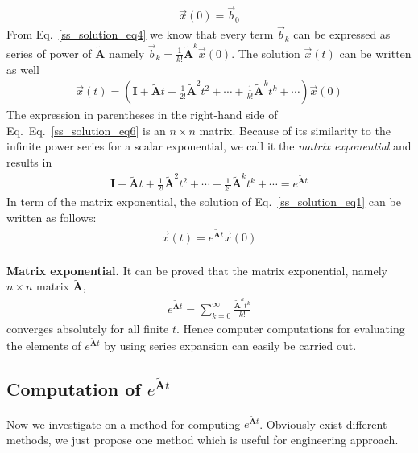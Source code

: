 \documentclass[12pt,a4paper,oneside]{book}
\begin{document}
\begin{onehalfspace}
\begin{equation}
	\begin{aligned}
		\vec{x}(0) = \vec{b}_0
	\end{aligned}
\end{equation}
From Eq.~\eqref{ss_solution_eq4} we know that every term $\vec{b}_k$ can be 
expressed as series of power of $\tilde{\mathbf{A}}$ namely $\vec{b}_k = 
\frac{1}{k!} \tilde{\mathbf{A}}^k \vec{x}(0)$. The solution $\vec{x}(t)$ can be 
written as well
\begin{equation}\label{ss_solution_eq6}
	\begin{aligned}
		\vec{x}(t) = \left(\mathbf{I} + \tilde{\mathbf{A}}t+\frac{1}{2!}\tilde{\mathbf{A}}^2t^2+\cdots+\frac{1}{k!}\tilde{\mathbf{A}}^kt^k+\cdots\right)\vec{x}(0)
	\end{aligned}
\end{equation}
The expression in parentheses in the right-hand side of 
Eq.~Eq.~\eqref{ss_solution_eq6} is an $n \times n$ matrix. Because of its 
similarity to the infinite power series for a scalar exponential, we call it 
the \textit{matrix exponential} and results in 
\begin{equation}\label{ss_solution_eq7}
	\begin{aligned}
		\mathbf{I} + \tilde{\mathbf{A}}t+\frac{1}{2!}\tilde{\mathbf{A}}^2t^2+\cdots+\frac{1}{k!}\tilde{\mathbf{A}}^kt^k+\cdots=e^{\tilde{\mathbf{A}}t}
	\end{aligned}
\end{equation}
In term of the matrix exponential, the solution of Eq.~\eqref{ss_solution_eq1} 
can be written as follows:
\begin{equation}\label{ss_solution_eq8}
	\begin{aligned}
		\vec{x}(t) = e^{\tilde{\mathbf{A}}t}\vec{x}(0)
	\end{aligned}
\end{equation}\\
\textbf{Matrix exponential.} It can be proved that the matrix exponential, 
namely $n \times n$ matrix $\tilde{\mathbf{A}}$,
\begin{equation}\label{ss_solution_eq9}
	\begin{aligned}
		e^{\tilde{\mathbf{A}}t}= \sum_{k=0}^{\infty}\frac{\tilde{\mathbf{A}}^kt^k}{k!}
	\end{aligned}
\end{equation}
converges absolutely for all finite $t$. Hence computer computations for evaluating the elements of $e^{\tilde{\mathbf{A}}t}$ by using series expansion can easily be carried out.
\subsection{Computation of $e^{\tilde{\mathbf{A}}t}$}
Now we investigate on a method for computing $e^{\tilde{\mathbf{A}}t}$. Obviously exist different methods, we just propose one method which is useful for engineering approach.


\end{onehalfspace}
\end{document}
